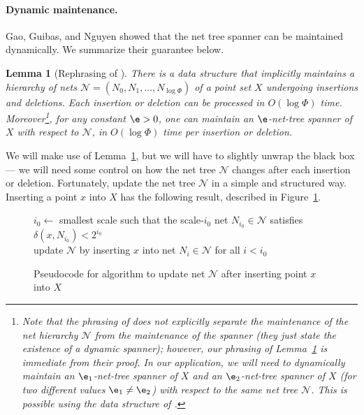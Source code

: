 \documentclass[11pt]{article}
\newtheorem{lemma}[theorem]{Lemma}
\newcommand{\cN}{\mathcal{N}}
\newcommand{\dist}{\ensuremath{\delta}}
\begin{document}
\paragraph{Dynamic maintenance.}
Gao, Guibas, and Nguyen \cite{gao2004deformable} showed that the net tree spanner can be maintained dynamically. We summarize their guarantee below.
\begin{lemma}[Rephrasing of {\cite[Theorem 4.2]{gao2004deformable}}]
\label{lem:deformable}
    There is a data structure that implicitly maintains a hierarchy of nets $\mathcal{N}=(N_0, N_1, \ldots, N_{\log \Phi})$ of a point set $X$ undergoing insertions and deletions. Each insertion or deletion can be processed in $O(\log \Phi)$ time.
% 
    Moreover\footnote{Note that the phrasing of \cite[Theorem 4.2]{gao2004deformable} does not explicitly separate the maintenance of the net hierarchy $\cN$ from the maintenance of the spanner (they just state the existence of a dynamic spanner); however, our phrasing of Lemma~\ref{lem:deformable} is immediate from their proof. In our application, we will need to dynamically maintain an $\e_1$-net-tree spanner of $X$ and an $\e_2$-net-tree spanner of $X$ (for two different values $\e_1 \neq \e_2$) \emph{with respect to the same net tree $\cN$}. This is possible using the data structure of \cite{gao2004deformable}.}, for any constant $\e > 0$, one can maintain an $\e$-net-tree spanner of $X$ with respect to $\mathcal{N}$, in $O(\log \Phi)$ time per insertion or deletion.
\end{lemma}
We will make use of Lemma~\ref{lem:deformable}, but we will have to slightly unwrap the black box --- we will need some control on how the net tree $\cN$ changes after each insertion or deletion. Fortunately, \cite{gao2004deformable} update the net tree $\mathcal{N}$ in a simple and structured way. Inserting a point $x$ into $X$ has the following result, described in Figure~\ref{fig:sparse-insert}.
\begin{figure}[h!]
    \centering
    \begin{algorithm}
    $i_0 \gets$ smallest scale such that the scale-$i_0$ net $N_{i_0} \in \cN$ satisfies $\dist(x, N_{i_0}) < 2^{i_0}$
    \\ update $\cN$ by inserting $x$ into net $N_i \in \cN$ for all $i < i_0$
    \end{algorithm}
    \caption{Pseudocode for \cite{gao2004deformable} algorithm to update net $\mathcal{N}$ after inserting point $x$ into $X$}
    \label{fig:sparse-insert}
\end{figure}
\end{document}
